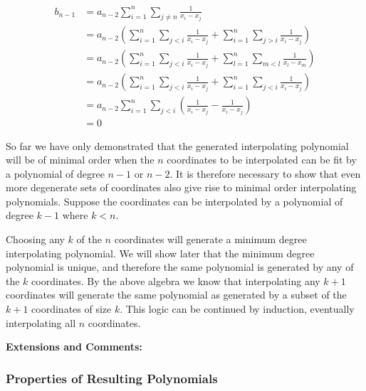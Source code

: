 \begin{subequations}
	\begin{align}
		b_{n-1} &= a_{n-2} \sum_{i=1}^n \sum_{j \ne n} \frac{1}{x_i - x_j}  \\
		&= a_{n-2} \left( \sum_{i=1}^n \sum_{j<i} \frac{1}{x_i - x_j} + \sum_{i=1}^n \sum_{j>i} \frac{1}{x_i - x_j} \right)  \\
		&= a_{n-2} \left( \sum_{i=1}^n \sum_{j<i} \frac{1}{x_i - x_j} + \sum_{l=1}^n \sum_{m<l} \frac{1}{x_l - x_m} \right)\label{eqn:InterpolatingPolynomials_HighestPowerCoefficientIsZeroC}  \\
		&= a_{n-2} \left( \sum_{i=1}^n \sum_{j<i} \frac{1}{x_i - x_j} + \sum_{i=1}^n \sum_{j<i} \frac{1}{x_i - x_j}\right)  \\
		&= a_{n-2} \sum_{i=1}^n \sum_{j<i} \left( \frac{1}{x_i - x_j} - \frac{1}{x_i - x_j}\right)  \\
		&= 0
	\end{align}
	\label{eqn:InterpolatingPolynomials_HighestPowerCoefficientIsZero}
\end{subequations}

So far we have only demonstrated that the generated interpolating polynomial will be of minimal order when the $n$ coordinates to be interpolated can be fit by a polynomial of degree $n - 1$ or $n - 2$. It is therefore necessary to show that even more degenerate sets of coordinates also give rise to minimal order interpolating polynomials. Suppose the coordinates can be interpolated by a polynomial of degree $k - 1$ where $k < n$.

Choosing any $k$ of the $n$ coordinates will generate a minimum degree interpolating polynomial. We will show later that the minimum degree polynomial is unique, and therefore the same polynomial is generated by any of the $k$ coordinates. By the above algebra we know that interpolating any $k + 1$ coordinates will generate the same polynomial as generated by a subset of the $k + 1$ coordinates of size $k$. This logic can be continued by induction, eventually interpolating all $n$ coordinates.

\textbf{Extensions and Comments:}


\subsubsection{Properties of Resulting Polynomials}


